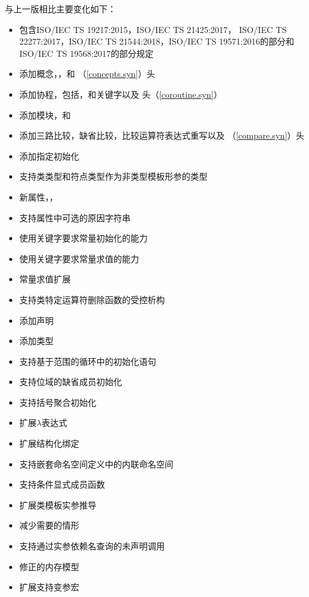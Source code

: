 \noindent
与上一版相比主要变化如下：
\begin{itemize}
  \renewcommand{\labelitemi}{---}
    \item{包含ISO/IEC TS 19217:2015，ISO/IEC TS 21425:2017，
    ISO/IEC TS 22277:2017，ISO/IEC TS 21544:2018，ISO/IEC TS 19571:2016的部分和
    ISO/IEC TS 19568:2017的部分规定}
  \item{添加概念，，和
    （\ref{concepts.syn}）头}
  \item{添加协程，包括，和关键字以及
    头（\ref{coroutine.syn}）}
  \item{添加模块，和}
  \item{添加三路比较，缺省比较，比较运算符表达式重写以及
    （\ref{compare.syn}）头}
  \item{添加指定初始化}
  \item{支持类类型和符点类型作为非类型模板形参的类型}
  \item{新属性，\tm{[[likely]]}，\tm{[[unlikely]]}}
  \item{支持\tm{[[nodiscard]]}属性中可选的原因字符串}
  \item{使用关键字要求常量初始化的能力}
  \item{使用关键字要求常量求值的能力}
  \item{常量求值扩展}
  \item{支持类特定运算符删除函数的受控析构}
  \item{添加声明}
  \item{添加类型}
  \item{支持基于范围的循环中的初始化语句}
  \item{支持位域的缺省成员初始化}
  \item{支持括号聚合初始化}
  \item{扩展$\lambda$表达式}
  \item{扩展结构化绑定}
  \item{支持嵌套命名空间定义中的内联命名空间}
  \item{支持条件显式成员函数}
  \item{扩展类模板实参推导}
  \item{减少需要的情形}
  \item{支持通过实参依赖名查询的未声明调用}
  \item{修正的内存模型}
  \item{扩展支持变参宏}

\end{itemize}
